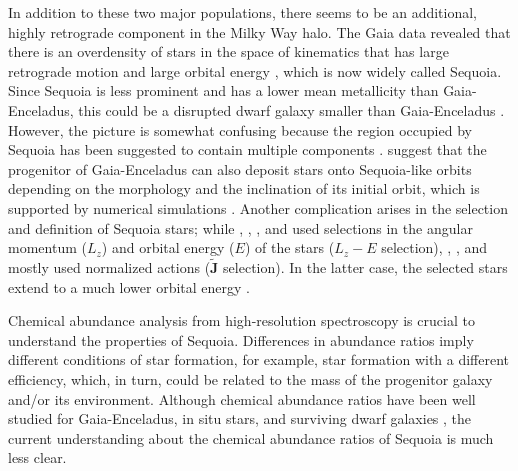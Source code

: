 \documentclass{aa}
\begin{document}
In addition to these two major populations, there seems to be an additional, highly retrograde component in the Milky Way halo.
The Gaia data revealed that there is an overdensity of stars in the space of kinematics that has large retrograde motion and large orbital energy \citep[e.g., ][]{Myeong2018c,Koppelman2018a,Yuan2020a,Naidu2020a}, which is now widely called {Sequoia}.
Since Sequoia is less prominent and has a lower mean metallicity than Gaia-Enceladus, this could be a disrupted dwarf galaxy smaller than Gaia-Enceladus \citep{Myeong2019a,Koppelman2019a,Matsuno2019a,Naidu2020a,Feuillet2021a}.
However, the picture is somewhat confusing because the region occupied by Sequoia has been suggested to contain multiple components \citep{Naidu2020a}.
\citet{Helmi2018a} suggest that the progenitor of Gaia-Enceladus can also deposit stars onto Sequoia-like orbits depending on the morphology and the inclination of its initial orbit, which is supported by numerical simulations \citep{Koppelman2019a}. 
Another complication arises in the selection and definition of Sequoia stars; while \citet{Matsuno2019a}, \citet{Koppelman2019a}, \citet{Naidu2020a}, and \citet{Aguado2021a} used selections in the angular momentum ($L_z$) and orbital energy ($E$) of the stars ($L_z-E$ selection), \citet{Myeong2019a}, \citet{Monty2020a}, and \citet{Feuillet2021a} mostly used normalized actions ($\tilde{\textbf{J}}$ selection).
In the latter case, the selected stars extend to a much lower orbital energy \citep[e.g.,][]{Feuillet2021a}.

Chemical abundance analysis from high-resolution spectroscopy is crucial to understand the properties of Sequoia.
Differences in abundance ratios imply different conditions of star formation, for example, star formation with a different efficiency, which, in turn, could be related to the mass of the progenitor galaxy and/or its environment. 
Although chemical abundance ratios have been well studied for Gaia-Enceladus, in situ stars, and surviving dwarf galaxies \citep[e.g.,][]{Venn2004a,Tolstoy2009,Nissen2010,Hasselquist2021a}, the current understanding about the chemical abundance ratios of Sequoia is much less clear. 
\end{document}
